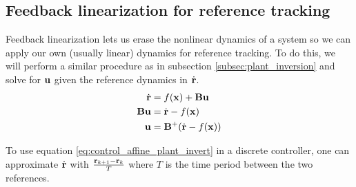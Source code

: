\subsection{Feedback linearization for reference tracking}

Feedback linearization lets us erase the nonlinear dynamics of a system so we
can apply our own (usually linear) dynamics for \gls{reference} tracking. To do
this, we will perform a similar procedure as in subsection
\ref{subsec:plant_inversion} and solve for $\mathbf{u}$ given the \gls{reference}
dynamics in $\dot{\mathbf{r}}$.
\begin{align}
  \dot{\mathbf{r}} &= f(\mathbf{x}) + \mathbf{B}\mathbf{u} \nonumber \\
  \mathbf{B}\mathbf{u} &= \dot{\mathbf{r}} - f(\mathbf{x}) \nonumber \\
  \mathbf{u} &= \mathbf{B}^+ (\dot{\mathbf{r}} - f(\mathbf{x}))
    \label{eq:control_affine_plant_invert}
\end{align}
\begin{remark}
  To use equation \eqref{eq:control_affine_plant_invert} in a discrete
  controller, one can approximate $\dot{\mathbf{r}}$ with
  $\frac{\mathbf{r}_{k + 1} - \mathbf{r}_k}{T}$ where $T$ is the time period between
  the two \glspl{reference}.
\end{remark}
